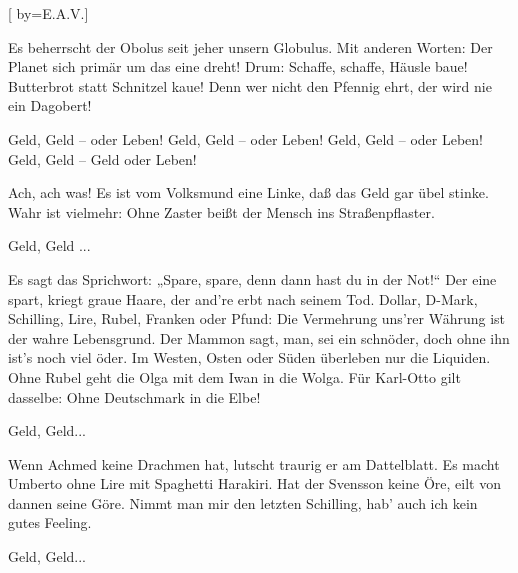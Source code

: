 [
	by={E.A.V.}]

\beginverse
Es beherrscht der Obolus seit jeher unsern Globulus.
Mit anderen Worten: Der Planet sich primär um das eine dreht!
Drum: Schaffe, schaffe, Häusle baue! Butterbrot statt Schnitzel kaue! 
Denn wer nicht den Pfennig ehrt, der wird nie ein Dagobert!
\endverse

\beginchorus
Geld, Geld -- oder Leben!
Geld, Geld -- oder Leben!
Geld, Geld -- oder Leben!
Geld, Geld -- Geld oder Leben!
\endchorus

\beginverse
Ach, ach was!
Es ist vom Volksmund eine Linke,
daß das Geld gar übel stinke.
Wahr ist vielmehr: Ohne Zaster
beißt der Mensch ins Straßenpflaster.

Geld, Geld ...
\endverse

\beginverse
Es sagt das Sprichwort: „Spare, spare,
denn dann hast du in der Not!“
Der eine spart, kriegt graue Haare,
der and're erbt nach seinem Tod.
\endverse
\beginverse
Dollar, D-Mark, Schilling, Lire,
Rubel, Franken oder Pfund:
Die Vermehrung uns'rer Währung
ist der wahre Lebensgrund.
\endverse
\beginverse
Der Mammon sagt, man, sei ein schnöder,
doch ohne ihn ist's noch viel öder.
Im Westen, Osten oder Süden
überleben nur die Liquiden.
\endverse
\beginverse
Ohne Rubel geht die Olga
mit dem Iwan in die Wolga.
Für Karl-Otto gilt dasselbe:
Ohne Deutschmark in die Elbe!

Geld, Geld...
\endverse

\beginverse
Wenn Achmed keine Drachmen hat,
lutscht traurig er am Dattelblatt.
Es macht Umberto ohne Lire
mit Spaghetti Harakiri.
\endverse
\beginverse
Hat der Svensson keine Öre,
eilt von dannen seine Göre.
Nimmt man mir den letzten Schilling,
hab' auch ich kein gutes Feeling.
\endverse

\beginchorus
Geld, Geld...
\endchorus


\endsong